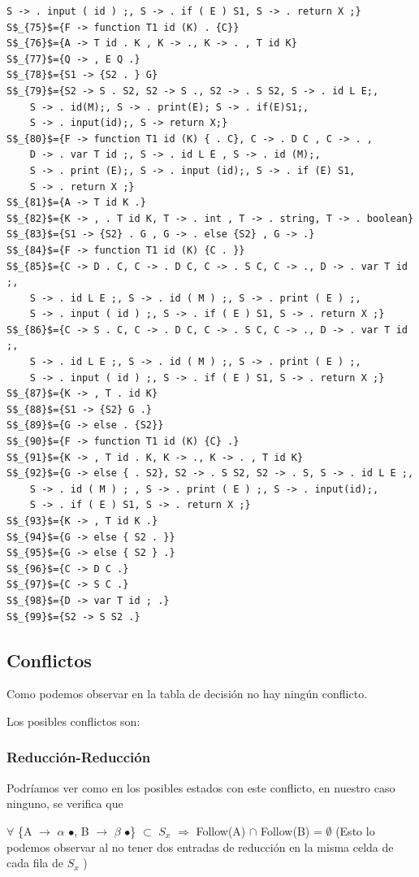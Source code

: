 \documentclass[a4paper, 12pt]{article}
\begin{document}
\begin{lstlisting}[style =EstadosAutomataST]
	S -> . input ( id ) ;, S -> . if ( E ) S1, S -> . return X ;}
S$_{75}$={F -> function T1 id (K) . {C}}
S$_{76}$={A -> T id . K , K -> ., K -> . , T id K}
S$_{77}$={Q -> , E Q .}
S$_{78}$={S1 -> {S2 . } G}
S$_{79}$={S2 -> S . S2, S2 -> S ., S2 -> . S S2, S -> . id L E;,
	S -> . id(M);, S -> . print(E); S -> . if(E)S1;,
	S -> . input(id);, S -> return X;}
S$_{80}$={F -> function T1 id (K) { . C}, C -> . D C , C -> . ,
	D -> . var T id ;, S -> . id L E , S -> . id (M);,
	S -> . print (E);, S -> . input (id);, S -> . if (E) S1,
	S -> . return X ;}
S$_{81}$={A -> T id K .}
S$_{82}$={K -> , . T id K, T -> . int , T -> . string, T -> . boolean}
S$_{83}$={S1 -> {S2} . G , G -> . else {S2} , G -> .}
S$_{84}$={F -> function T1 id (K) {C . }}
S$_{85}$={C -> D . C, C -> . D C, C -> . S C, C -> ., D -> . var T id ;,
	S -> . id L E ;, S -> . id ( M ) ;, S -> . print ( E ) ;,
	S -> . input ( id ) ;, S -> . if ( E ) S1, S -> . return X ;}
S$_{86}$={C -> S . C, C -> . D C, C -> . S C, C -> ., D -> . var T id ;,
	S -> . id L E ;, S -> . id ( M ) ;, S -> . print ( E ) ;,
	S -> . input ( id ) ;, S -> . if ( E ) S1, S -> . return X ;}
S$_{87}$={K -> , T . id K}
S$_{88}$={S1 -> {S2} G .}
S$_{89}$={G -> else . {S2}}
S$_{90}$={F -> function T1 id (K) {C} .}
S$_{91}$={K -> , T id . K, K -> ., K -> . , T id K}
S$_{92}$={G -> else { . S2}, S2 -> . S S2, S2 -> . S, S -> . id L E ;,
	S -> . id ( M ) ; , S -> . print ( E ) ;, S -> . input(id);,
	S -> . if ( E ) S1, S -> . return X ;}
S$_{93}$={K -> , T id K .}  
S$_{94}$={G -> else { S2 . }}
S$_{95}$={G -> else { S2 } .}
S$_{96}$={C -> D C .}
S$_{97}$={C -> S C .}
S$_{98}$={D -> var T id ; .}
S$_{99}$={S2 -> S S2 .}
\end{lstlisting}

\subsection{Conflictos}
Como podemos observar en la tabla de decisión no hay ningún conflicto.

Los posibles conflictos son:
	\subsubsection*{Reducción-Reducción}
	Podríamos ver como en los posibles estados con este conflicto, en nuestro caso ninguno, se verifica que 
	
	$\forall$ \{A $\rightarrow$ $\alpha$ $\bullet$, B $\rightarrow$ $\beta$ $\bullet$\} $\subset$ $S_x$ $\Rightarrow$ Follow(A) $\cap$ Follow(B) = $\emptyset$ (Esto lo podemos observar al no tener dos entradas de reducción en la misma celda de cada fila de $S_x$ )
	
\end{document}
